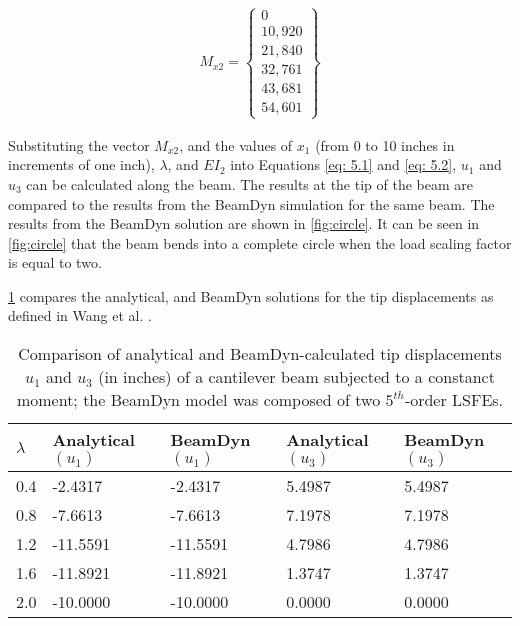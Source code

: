 \documentclass[letterpaper,12pt]{article}
\begin{document}
\begin{align*}
M_{x2} = \begin{Bmatrix}
0 \\
10,920 \\
21,840 \\ 
32,761 \\ 
43,681 \\ 
54,601
\end{Bmatrix}
\end{align*}

Substituting the vector $M_{x2}$, and the values of $x_1$ (from 0 to 10 inches in increments of one inch), $\lambda$, and $EI_2$ into Equations \ref{eq: 5.1} and \ref{eq: 5.2}, $u_1$ and $u_3$ can be calculated along the beam. The results at the tip of the beam are compared to the results from the BeamDyn simulation for the same beam. The results from the BeamDyn solution are shown in \ref{fig:circle}. It can be seen in \ref{fig:circle} that the beam bends into a complete circle when the load scaling factor is equal to two. 


\ref{tab:results 1} compares the analytical, and BeamDyn solutions for the tip displacements as defined in Wang et al. \cite{Wang:GEBT2014}.



\begin{table} [H]
\caption{\label{tab:results 1} Comparison of analytical and BeamDyn-calculated tip displacements $u_1$ and $u_3$ (in inches) of a cantilever beam subjected to a constanct moment; the BeamDyn model was composed of two $5^{th}$-order LSFEs.}
\begin{center}
    \begin{tabular}{| l | l | l | l | l |}
    	\hline
    	$\lambda$ & Analytical $(u_1)$ & BeamDyn $(u_1)$ & Analytical $(u_3)$ & BeamDyn $(u_3)$ \\ 
    	\hline
    	0.4       & -2.4317          & -2.4317      & 5.4987           & 5.4987        \\ 
    	\hline
    	0.8       & -7.6613          & -7.6613      & 7.1978           & 7.1978        \\ 
    	\hline
    	1.2       & -11.5591         & -11.5591     & 4.7986           & 4.7986        \\ 
    	\hline
    	1.6       & -11.8921         & -11.8921     & 1.3747           & 1.3747        \\ 
    	\hline
    	2.0         & -10.0000         & -10.0000     & 0.0000           & 0.0000        \\ 
    	\hline
    \end{tabular}
\end{center}
\end{table}
	
\end{document}
